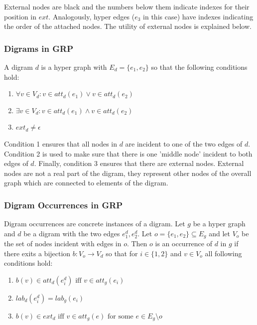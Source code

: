 External nodes are black and the numbers below them indicate indexes for their position in $ext$. Analogously,  hyper edges ($e_3$ in this case) have indexes indicating the order of the attached nodes. The utility of external nodes is explained below.~\cite{maneth}

\subsubsection{Digrams in GRP}

A digram $d$ is a hyper graph with $E_d=\{e_1,e_2\}$ so that the following conditions hold:

\begin{enumerate}
	\item $\forall v \in V_d : v\in att_d(e_1) \vee v \in att_d(e_2)$
	\item $\exists v\in V_d : v\in att_d(e_1) \wedge v\in att_d(e_2)$
	\item $ext_d \not= \epsilon$
\end{enumerate}

Condition 1 ensures that all nodes in $d$ are incident to one of the two edges of $d$. Condition 2 is used to make sure that there is one 'middle node' incident to both edges of $d$. Finally, condition 3 ensures that there are external nodes. External nodes are not a real part of the digram, they represent other nodes of the overall graph which are connected to elements of the digram.~\cite{maneth}


\subsubsection{Digram Occurrences in GRP}

Digram occurrences are concrete instances of a digram. Let $g$ be a hyper graph and $d$ be a digram with the two edges $e_1^d,e_2^d$. Let $o=\{e_1,e_2\} \subseteq E_g$ and let $V_o$ be the set of nodes incident with edges in $o$. Then $o$ is an occurrence of $d$ in $g$ if there exits a bijection $b:V_o \to V_d$ so that for $i\in \{1,2\} $ and $v\in V_o$ all following conditions hold:

\begin{enumerate}
	\item $b(v)\in att_d(e_i^d) \text{ iff } v\in att_g(e_i)$
	\item $lab_d(e_i^d)=lab_g(e_i)$
	\item $b(v)\in ext_d \text{ iff } v\in att_g(e) \text{ for some } e\in E_g \setminus o$
\end{enumerate}

